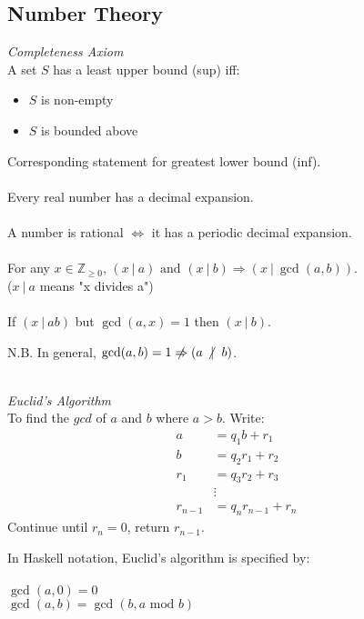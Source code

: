 \documentclass{scrartcl}
\newcommand{\Z}{\mathbb{Z}}
\begin{document}
\subsection{Number Theory}
\textit{Completeness Axiom}
\\
A set $ S $ has a least upper bound (sup) iff:
\begin{itemize}
\item $ S $ is non-empty
\item $ S $ is bounded above
\end{itemize}
Corresponding statement for greatest lower bound (inf).
\\\\
Every real number has a decimal expansion.
\\\\
A number is rational $ \Leftrightarrow $ it has a periodic decimal expansion.
\\\\
For any $ x \in \Z_{\geq 0} $, $ (x \ | \ a) \textrm{ and } (x \ | \ b) \Rightarrow (x \ | \ \gcd(a, b)) $.
\\
($ x \ | \ a  $ means "x divides a")
\\\\
If $  (x \ | \ ab) $ but $ \gcd(a, x) = 1 $ then $ (x \ | \ b ) $.
\\
\begin{tcolorbox}[breakable]
N.B. In general, $ \gcd(a, b) = 1 \centernot\Rightarrow (a \ \centernot| \ b) $.
\end{tcolorbox}
\noindent
\\
\textit{Euclid's Algorithm}
\\
To find the $ gcd $ of $ a $ and $ b $ where $ a > b $. Write:
\begin{align}
a & = q_{1} b + r_{1} \\
b & = q_{2} r_{1} + r_{2} \\
r_{1} & = q_{3} r_{2} + r_{3} \\
& \vdots \\
r_{n-1} & = q_{n} r_{n-1} + r_{n}
\end{align}
Continue until $ r_{n} = 0 $, return $ r_{n-1} $.
\\
\begin{tcolorbox}[breakable]
In Haskell notation, Euclid's algorithm is specified by:
\\\\
$ \gcd(a, 0) = 0 $
\\
$ \gcd(a, b) = \gcd(b, a \textrm{ mod } b) $
\end{tcolorbox}
\end{document}
